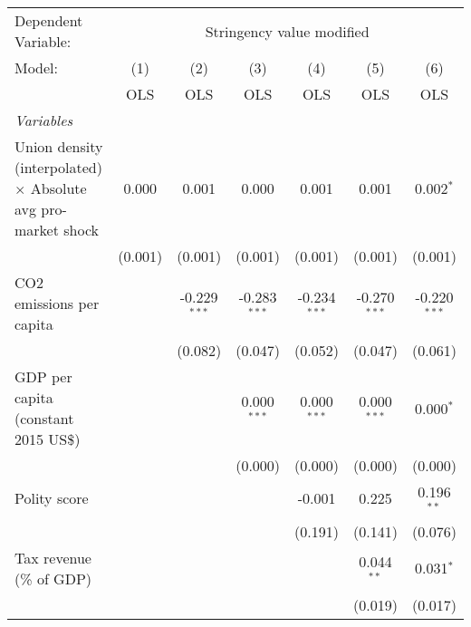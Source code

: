 
\begingroup
\centering
\begin{tabular}{lcccccc}
   \toprule
   Dependent Variable: & \multicolumn{6}{c}{Stringency value modified}\\
   Model:                                                               & (1)     & (2)            & (3)            & (4)            & (5)            & (6)\\  
                                                                        &  OLS    & OLS            & OLS            & OLS            & OLS            & OLS\\  
   \midrule
   \emph{Variables}\\
   Union density (interpolated) $\times$ Absolute avg pro-market shock  & 0.000   & 0.001          & 0.000          & 0.001          & 0.001          & 0.002$^{*}$\\   
                                                                        & (0.001) & (0.001)        & (0.001)        & (0.001)        & (0.001)        & (0.001)\\   
   CO2 emissions per capita                                             &         & -0.229$^{***}$ & -0.283$^{***}$ & -0.234$^{***}$ & -0.270$^{***}$ & -0.220$^{***}$\\   
                                                                        &         & (0.082)        & (0.047)        & (0.052)        & (0.047)        & (0.061)\\   
   GDP per capita (constant 2015 US\$)                                  &         &                & 0.000$^{***}$  & 0.000$^{***}$  & 0.000$^{***}$  & 0.000$^{*}$\\   
                                                                        &         &                & (0.000)        & (0.000)        & (0.000)        & (0.000)\\   
   Polity score                                                         &         &                &                & -0.001         & 0.225          & 0.196$^{**}$\\   
                                                                        &         &                &                & (0.191)        & (0.141)        & (0.076)\\   
   Tax revenue (\% of GDP)                                              &         &                &                &                & 0.044$^{**}$   & 0.031$^{*}$\\   
                                                                        &         &                &                &                & (0.019)        & (0.017)\\   

\end{tabular}
